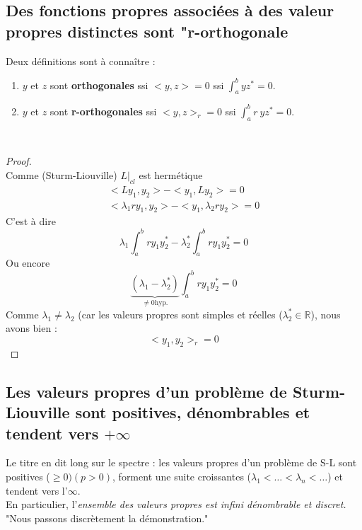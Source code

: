\documentclass[11pt, a4paper, openany]{book}
\begin{document}
		\subsection{Des fonctions propres associées à des valeur propres distinctes sont "r-orthogonale}
		Deux définitions sont à connaître
		:
		\begin{enumerate}
			\item $y$ et $z$ sont \textbf{orthogonales} ssi $<y,z> = 0$ ssi $ \int_a^b yz^* = 0.$
			\item $y$ et $z$ sont \textbf{r-orthogonales} ssi $<y,z>_r = 0$ ssi $ \int_a^b r\ yz^* = 0.$
		\end{enumerate}\ \\
													
		\begin{proof}
			\ \\
			Comme (Sturm-Liouville) $L|_{cl}$ est hermétique
			\begin{eqnarray}
				<Ly_1,y_2> - <y_1,Ly_2> = 0\\
				<\lambda_1 ry_1,y_2> - <y_1, \lambda_2 ry_2>  =0
			\end{eqnarray}
			C'est à dire
			\begin{equation}
				\lambda_1\int_a^b ry_1y_2^* - \lambda_2^* \int_a^b ry_1y_2^* = 0
			\end{equation}
			Ou encore
			\begin{equation}
				\underbrace{(\lambda_1 - \lambda_2^*)}_{\neq 0 \text{hyp.}}\int_a^b r y_1y_2^* = 0
			\end{equation}
			Comme $\lambda_1 \neq \lambda_2$ (car les valeurs propres sont simples et réelles ($\lambda_2^* \in \mathbb{R}$), nous avons bien :
			\begin{equation}
				<y_1,y_2>_r = 0
			\end{equation}
		\end{proof}
													
													
		\subsection{Les valeurs propres d'un problème de Sturm-Liouville sont positives, dénombrables et tendent vers $+\infty$}
		Le titre en dit long sur le spectre : les valeurs propres d'un  problème de S-L sont positives ($\geq 0)(p>0)$, forment une suite croissantes ($\lambda_1 < \dots < \lambda_n < \dots$) et tendent vers l'$\infty$.\\
		En particulier, l'\textit{ensemble des valeurs propres est infini dénombrable et discret.}\\
		"Nous passons discrètement la démonstration."
													
\end{document}
